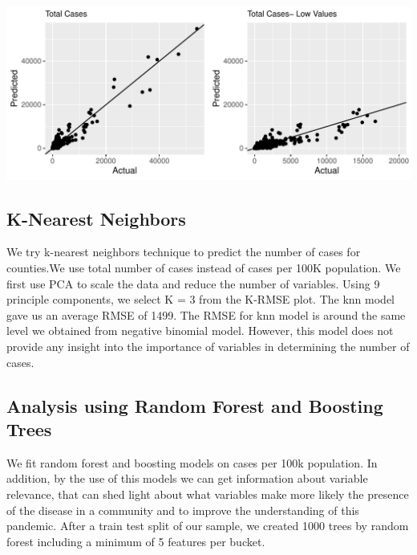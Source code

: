 \documentclass[
]{article}
\begin{document}
\includegraphics{covid_tree_analysis_files/figure-latex/unnamed-chunk-11-1.pdf}

\hypertarget{k-nearest-neighbors}{%
\subsection{K-Nearest Neighbors}\label{k-nearest-neighbors}}

We try k-nearest neighbors technique to predict the number of cases for
counties.We use total number of cases instead of cases per 100K
population. We first use PCA to scale the data and reduce the number of
variables. Using 9 principle components, we select K = 3 from the K-RMSE
plot. The knn model gave us an average RMSE of 1499. The RMSE for knn
model is around the same level we obtained from negative binomial model.
However, this model does not provide any insight into the importance of
variables in determining the number of cases.

\hypertarget{analysis-using-random-forest-and-boosting-trees}{%
\subsection{Analysis using Random Forest and Boosting
Trees}\label{analysis-using-random-forest-and-boosting-trees}}

We fit random forest and boosting models on cases per 100k population.
In addition, by the use of this models we can get information about
variable relevance, that can shed light about what variables make more
likely the presence of the disease in a community and to improve the
understanding of this pandemic. After a train test split of our sample,
we created 1000 trees by random forest including a minimum of 5 features
per bucket.
\end{document}
